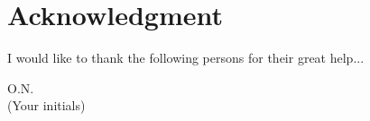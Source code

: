 \section*{Acknowledgment}
I would like to thank the following persons for their great help...

\begin{flushright}
O.N.\\[1pc]
(Your initials)
\end{flushright}